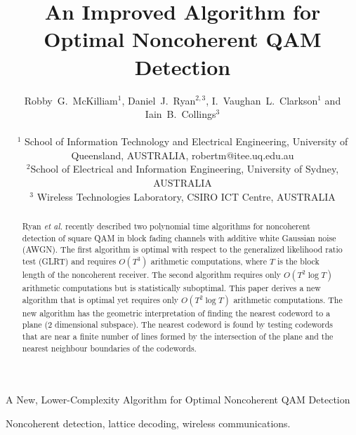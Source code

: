 \documentclass[conference]{IEEEtran}
\begin{document}
\title{An Improved Algorithm for Optimal Noncoherent QAM Detection}

\author{
Robby~G.~McKilliam${}^{1}$, Daniel~J.~Ryan${}^{2,3}$, I.~Vaughan~L.~Clarkson${}^{1}$ and Iain~B.~Collings${}^{3}$
\\ \\ \small
${}^1$ School of Information Technology and Electrical Engineering, University of Queensland, AUSTRALIA, robertm@itee.uq.edu.au
\\
${}^2$School of Electrical and Information Engineering, University of Sydney, AUSTRALIA
\\
${}^3$ Wireless Technologies Laboratory, CSIRO ICT Centre, AUSTRALIA
}

%
{A New, Lower-Complexity Algorithm for Optimal Noncoherent QAM Detection}

\maketitle

\begin{abstract}
\boldmath
Ryan \emph{et al.} \cite{Ryan2007} recently described two polynomial time algorithms for noncoherent detection of square QAM in block fading channels with additive white Gaussian noise (AWGN).  The first algorithm is optimal with respect to the generalized likelihood ratio test (GLRT) and requires $O(T^3)$ arithmetic computations, where $T$ is the block length of the noncoherent receiver.  The second algorithm requires only $O(T^2\log{T})$ arithmetic computations but is statistically suboptimal.  This paper derives a new algorithm that is optimal yet requires only $O(T^2\log{T})$ arithmetic computations.  The new algorithm has the geometric interpretation of finding the nearest codeword to a plane (2 dimensional subspace).  The nearest codeword is found by testing codewords that are near a finite number of lines formed by the intersection of the plane and the nearest neighbour boundaries of the codewords.
\end{abstract}

\begin{IEEEkeywords}
Noncoherent detection, lattice decoding, wireless communications.
\end{IEEEkeywords}
\end{document}

